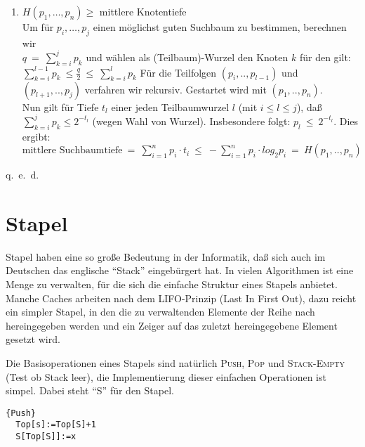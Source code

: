 \begin{beweis}
\begin{enumerate}
    \item $\displaystyle H(p_1,\ldots,p_n)\geq$ mittlere Knotentiefe  \vspace{2mm}\\
      Um für $p_i,\ldots,p_j$ einen möglichst guten Suchbaum zu bestimmen, berechnen wir\\ $q\:=\:\sum_{k=i}^j p_k$ und wählen
      als (Teilbaum)-Wurzel den Knoten $k$ für den gilt: $\sum_{k=i}^{l-1}p_k\:\leq\frac{q}{2}\:\leq\:\sum_{k=i}^{l}p_k$
      Für die Teilfolgen $(p_i,..,p_{l-1})$ und $(p_{l+1},..,p_j)$ verfahren wir rekursiv. Gestartet wird mit $(p_1,..,p_n)$.\\
      Nun gilt für Tiefe $t_l$ einer jeden Teilbaumwurzel $l$ (mit $i\leq l\leq j$), daß $\sum_{k=i}^j p_k \leq 2^{-t_l}$
      (wegen Wahl von Wurzel). Insbesondere folgt: $p_l\:\leq\:2^{-t_l}$. Dies ergibt:
      $\mbox{mittlere Suchbaumtiefe}\:=\:\sum_{i=1}^n p_i\cdot t_i\:\leq\:-\sum_{i=1}^n p_i\cdot log_2p_i\:=\:H(p_1,..,p_n)$
\end{enumerate}
\end{beweis}
\begin{flushright} q.~e.~d. \end{flushright}

\section{Stapel}
Stapel haben eine so große Bedeutung in der Informatik, daß sich auch im Deutschen das englische "`Stack"' eingebürgert hat.
In vielen Algorithmen ist eine Menge zu verwalten, für die sich die einfache Struktur eines Stapels anbietet.
Manche Caches arbeiten nach dem LIFO-Prinzip (Last In First Out), dazu reicht ein simpler Stapel, in den die zu verwaltenden Elemente
der Reihe nach hereingegeben werden und ein Zeiger auf das zuletzt hereingegebene Element gesetzt wird.

\begin{figure}[H]
  \centering
  \label{031203a}
\end{figure}

Die Basisoperationen eines Stapels sind natürlich \textsc{Push}, \textsc{Pop} und \textsc{Stack-Empty} (Test ob Stack leer), die Implementierung dieser einfachen
Operationen ist simpel. Dabei steht "`S"' für den Stapel.

\begin{Algorithmus}[H]
\begin{lstlisting}[frame=tlrb, mathescape=true, title=\textsc{Push}, gobble=1]{Push}
  Top[s]:=Top[S]+1
  S[Top[S]]:=x
\end{lstlisting}
\end{Algorithmus}

